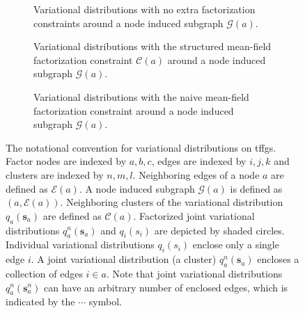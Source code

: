 \begin{figure}
  \centering
  \begin{subfigure}[t]{0.310\textwidth}
    \centering
    \resizebox{\textwidth}{!}{}
    \caption{Variational distributions with no extra factorization constraints around a node induced subgraph $\mathcal{G}(a)$.}
    \label{fig:mp:notation_qs_g_i_msgs}
  \end{subfigure}
  \hfill
  \begin{subfigure}[t]{0.310\textwidth}
    \centering
    \resizebox{\textwidth}{!}{}
    \caption{Variational distributions with the structured mean-field factorization constraint $\mathcal{C}(a)$ around a node induced subgraph $\mathcal{G}(a)$.}
    \label{fig:mp:notation_qs_g_a_structured}
  \end{subfigure}
  \hfill
  \begin{subfigure}[t]{0.310\textwidth}
    \centering
    \resizebox{\textwidth}{!}{}
    \caption{Variational distributions with the naive mean-field factorization constraint around a node induced subgraph $\mathcal{G}(a)$.}
    \label{fig:mp:notation_qs_g_a_mean_field}
  \end{subfigure}
  \caption{The notational convention for variational distributions on \acp{tffg}.
    Factor nodes are indexed by $a, b, c$, edges are indexed by $i, j, k$ and clusters are indexed
    by $n, m, l$.
    Neighboring edges of a node $a$ are defined as $\mathcal{E}(a)$.
    A node induced subgraph $\mathcal{G}(a)$ is defined as $(a, \mathcal{E}(a))$.
    Neighboring clusters of the variational distribution $q_a(\bm{s}_a)$ are defined as
    $\mathcal{C}(a)$.
    Factorized joint variational distributions $q^n_a(\bm{s}_a)$ and $q_i(s_i)$ are depicted by
    shaded circles.
    Individual variational distributions $q_i(s_i)$ enclose only a single edge $i$.
    A joint variational distribution (a cluster) $q^n_a(\bm{s}_a)$ encloses a collection of edges
    $i \in a$.
    Note that joint variational distributions $q^n_a(\bm{s}^n_a)$ can have an arbitrary number of
    enclosed edges, which is indicated by the $\cdots$ symbol.
  }
  \label{fig:mp:notation_qs}
\end{figure}

